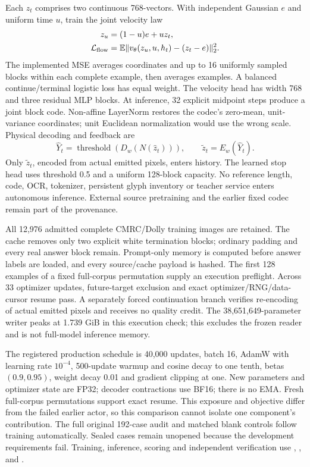 \documentclass[10pt,a4paper]{article}
\begin{document}
Each $z_t$ comprises two continuous 768-vectors. With independent Gaussian
$e$ and uniform time $u$, train the joint velocity law
\begin{align}
 z_u&=(1-u)e+uz_t,\\
 \mathcal L_{\rm flow}&=\mathbb E\|v_\theta(z_u,u,h_t)-(z_t-e)\|_2^2.
\end{align}
The implemented MSE averages coordinates and up to 16 uniformly sampled
blocks within each complete example, then averages examples. A balanced
continue/terminal logistic loss has equal weight. The velocity head has width
768 and three residual MLP blocks. At inference, 32 explicit midpoint steps
produce a joint block code. Non-affine LayerNorm restores the codec's
zero-mean, unit-variance coordinates; unit Euclidean normalization would use
the wrong scale. Physical decoding and feedback are
\begin{equation}
 \widehat Y_t=\operatorname{threshold}(D_w(N(\widehat z_t))),
 \qquad \widetilde z_t=E_w(\widehat Y_t).
\end{equation}
Only $\widetilde z_t$, encoded from actual emitted pixels, enters history.
The learned stop head uses threshold 0.5 and a uniform 128-block capacity.
No reference length, code, OCR, tokenizer, persistent glyph inventory or
teacher service enters autonomous inference. External source pretraining and
the earlier fixed codec remain part of the provenance.

All 12,976 admitted complete CMRC/Dolly training images are retained. The
cache removes only two explicit white termination blocks; ordinary padding
and every real answer block remain. Prompt-only memory is computed before
answer labels are loaded, and every source/cache payload is hashed. The
first 128 examples of a fixed full-corpus permutation supply an execution
preflight. Across 33 optimizer updates, future-target exclusion and exact
optimizer/RNG/data-cursor resume pass. A separately forced continuation branch
verifies re-encoding of actual emitted pixels and receives no quality credit.
The 38,651,649-parameter writer peaks at 1.739 GiB in this execution check;
this excludes the frozen reader and is not full-model inference memory.

The registered production schedule is 40,000 updates, batch 16, AdamW with
learning rate $10^{-4}$, 500-update warmup and cosine decay to one tenth,
betas $(0.9,0.95)$, weight decay 0.01 and gradient clipping at one. New
parameters and optimizer state are FP32; decoder contractions use BF16;
there is no EMA. Fresh full-corpus permutations support exact resume. This
exposure and objective differ from the failed earlier actor, so this
comparison cannot isolate one component's contribution. The full original
192-case audit and matched blank controls follow training automatically.
Sealed cases remain unopened because the development requirements fail.
Training, inference, scoring and independent verification use
,
,
 and
.
\end{document}
